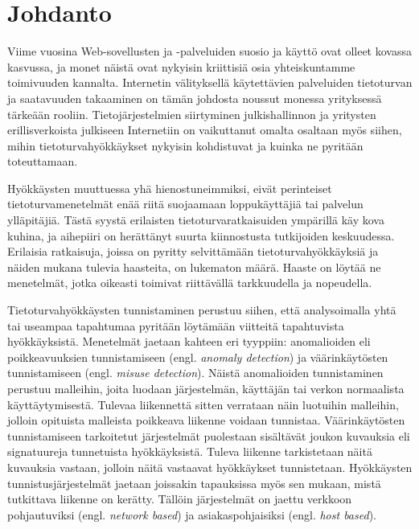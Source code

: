 
\chapter{Johdanto}

Viime vuosina Web-sovellusten ja -palveluiden suosio ja käyttö ovat
olleet kovassa kasvussa, ja monet näistä ovat nykyisin kriittisiä osia
yhteiskuntamme toimivuuden kannalta. Internetin välityksellä
käytettävien palveluiden tietoturvan ja saatavuuden takaaminen on
tämän johdosta noussut monessa yrityksessä tärkeään rooliin.
Tietojärjestelmien siirtyminen julkishallinnon ja
yritysten erillisverkoista julkiseen Internetiin on vaikuttanut omalta
osaltaan myös siihen, mihin tietoturvahyökkäykset nykyisin
kohdistuvat ja kuinka ne pyritään toteuttamaan.

Hyökkäysten muuttuessa yhä hienostuneimmiksi, eivät perinteiset
tietoturvamenetelmät enää riitä suojaamaan loppukäyttäjiä tai palvelun
ylläpitäjiä. Tästä syystä erilaisten tietoturvaratkaisuiden ympärillä
käy kova kuhina, ja aihepiiri on herättänyt suurta kiinnostusta
tutkijoiden keskuudessa. Erilaisia ratkaisuja, joissa on pyritty
selvittämään tietoturvahyökkäyksiä ja näiden mukana tulevia haasteita,
on lukematon määrä. Haaste on löytää ne menetelmät, jotka oikeasti
toimivat riittävällä tarkkuudella ja nopeudella.

Tietoturvahyökkäysten tunnistaminen perustuu siihen, että
analysoimalla yhtä tai useampaa tapahtumaa pyritään löytämään
viitteitä tapahtuvista hyökkäyksistä. Menetelmät jaetaan kahteen eri
tyyppiin: anomalioiden eli poikkeavuuksien tunnistamiseen
(engl. \textit{anomaly detection}) ja väärinkäytösten tunnistamiseen
(engl. \textit{misuse detection}). Näistä anomalioiden tunnistaminen
perustuu malleihin, joita luodaan järjestelmän, käyttäjän tai verkon
normaalista käyttäytymisestä. Tulevaa liikennettä sitten verrataan 
näin luotuihin malleihin, jolloin opituista malleista poikkeava liikenne
voidaan tunnistaa. Väärinkäytösten tunnistamiseen tarkoitetut järjestelmät 
puolestaan sisältävät joukon kuvauksia eli signatuureja tunnetuista hyökkäyksistä. 
Tuleva liikenne tarkistetaan näitä kuvauksia vastaan, jolloin näitä vastaavat
hyökkäykset tunnistetaan. Hyökkäysten tunnistusjärjestelmät
jaetaan joissakin tapauksissa myös sen mukaan, mistä tutkittava
liikenne on kerätty. Tällöin järjestelmät on jaettu verkkoon
pohjautuviksi (engl. \textit{network based}) ja asiakaspohjaisiksi
(engl. \textit{host based}).

